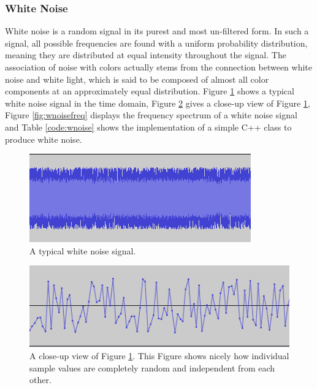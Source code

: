 
\subsubsection{White Noise}

White noise is a random signal in its purest and most un-filtered form. In such a signal, all possible frequencies are found with a uniform probability distribution, meaning they are distributed at equal intensity throughout the signal. The association of noise with colors actually stems from the connection between white noise and white light, which is said to be composed of almost all color components at an approximately equal distribution. Figure \ref{fig:wnoise} shows a typical white noise signal in the time domain, Figure \ref{fig:wnoisez} gives a close-up view of Figure \ref{fig:wnoise}, Figure \ref{fig:wnoisefreq} displays the frequency spectrum of a white noise signal and Table \ref{code:wnoise} shows the implementation of a simple C++ class to produce white noise.

\pagebreak

\begin{figure}[ht!]
	\includegraphics[scale=0.62]{img/wnoise}
	\caption{A typical white noise signal.}
	\label{fig:wnoise}
\end{figure}

\begin{figure}[ht!]
	\includegraphics[scale=0.5]{img/wnoisez}
	\caption{A close-up view of Figure \ref{fig:wnoise}. This Figure shows nicely how individual sample values are completely random and independent from each other. }
	\label{fig:wnoisez}
\end{figure}

